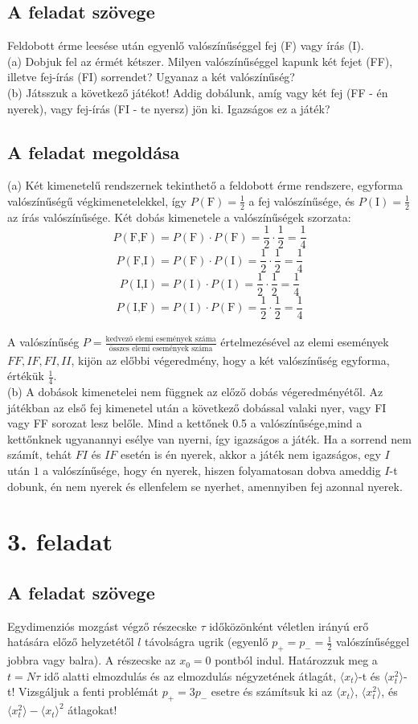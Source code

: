 \documentclass[12pt]{article}
\begin{document}
\subsection*{A feladat szövege}
Feldobott érme leesése után egyenlő valószínűséggel fej (F) vagy írás (I).
\\
(a) Dobjuk fel az érmét kétszer. Milyen valószínűséggel kapunk két fejet (FF), illetve fej-írás (FI) sorrendet? Ugyanaz a két valószínűség?
\\ 
(b) Játsszuk a következő játékot! Addig dobálunk, amíg vagy két fej (FF - én nyerek), vagy fej-írás (FI - te nyersz) jön ki. Igazságos ez a játék?
\subsection*{A feladat megoldása}
(a) Két kimenetelű rendszernek tekinthető a feldobott érme rendszere, egyforma valószínűségű végkimenetelekkel, így $P(\text{F}) = \frac{1}{2} $ a fej valószínűsége, és  $P(\text{I}) = \frac{1}{2} $ az írás valószínűsége. Két dobás kimenetele a valószínűségek szorzata: $$P(\text{F,F}) = P(\text{F})\cdot P(\text{F}) = \frac{1}{2}\cdot \frac{1}{2} = \frac{1}{4} $$
$$P(\text{F,I}) = P(\text{F})\cdot P(\text{I}) = \frac{1}{2}\cdot \frac{1}{2} = \frac{1}{4} $$
$$P(\text{I,I}) = P(\text{I})\cdot P(\text{I}) = \frac{1}{2}\cdot \frac{1}{2} = \frac{1}{4} $$
$$P(\text{I,F}) = P(\text{I})\cdot P(\text{F}) = \frac{1}{2}\cdot \frac{1}{2} = \frac{1}{4} $$
\\
A valószínűség $P = \frac{\text{kedvező elemi események száma}}{\text{összes elemi események száma}}$ értelmezésével az elemi események ${FF, IF, FI, II}$, kijön az előbbi végeredmény, hogy a két valószínűség egyforma, értékük $\frac{1}{4}$.\\
(b) A dobások kimenetelei nem függnek az előző dobás végeredményétől. Az játékban az első fej kimenetel után a következő dobással valaki nyer, vagy FI vagy FF sorozat lesz belőle. Mind a kettőnek 0.5 a valószínűsége,mind a kettőnknek ugyanannyi esélye van nyerni, így igazságos a játék. Ha a sorrend nem számít, tehát $FI$ és $IF$ esetén is én nyerek, akkor a játék nem igazságos, egy $I$ után $1$ a valószínűsége, hogy én nyerek, hiszen folyamatosan dobva ameddig $I$-t dobunk, én nem nyerek és ellenfelem se nyerhet, amennyiben fej azonnal nyerek.
\newpage
\section*{3. feladat}
\subsection*{A feladat szövege}
Egydimenziós mozgást végző részecske $\tau$ időközönként véletlen irányú erő hatására előző helyzetétől $l$ távolságra ugrik (egyenlő $p_{+} = p_{-} =\frac{1}{2} $ valószínűséggel jobbra vagy balra). A részecske az $x_0 = 0$ pontból indul.
Határozzuk meg a $ t = N \tau$ idő alatti elmozdulás és az elmozdulás négyzetének átlagát, $\langle x_t\rangle$-t és $\langle x^2_t \rangle$-t!
Vizsgáljuk a fenti problémát $p_+ = 3p_-$ esetre és számítsuk ki az $\langle x_t \rangle $, $\langle x^2_t\rangle$, és $\langle x^2_t\rangle-\langle x_t \rangle ^2$ átlagokat!
\end{document}
